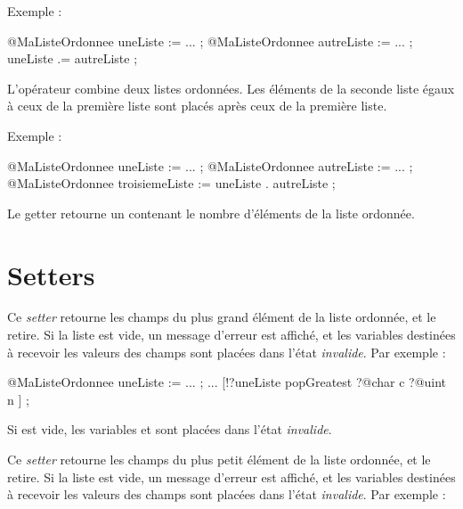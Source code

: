 Exemple :
\begin{galgascode}
@MaListeOrdonnee uneListe := ... ;
@MaListeOrdonnee autreListe := ... ;
uneListe .= autreListe ;
\end{galgascode}


L'opérateur  combine deux listes ordonnées. Les éléments de la seconde liste égaux à ceux de la première liste sont placés après ceux de la première liste.

Exemple :
\begin{galgascode}
@MaListeOrdonnee uneListe := ... ;
@MaListeOrdonnee autreListe := ... ;
@MaListeOrdonnee troisiemeListe := uneListe . autreListe ;
\end{galgascode}








Le getter  retourne un  contenant le nombre d'éléments de la liste ordonnée.






\section{Setters}


Ce \emph{setter} retourne les champs du plus grand élément de la liste ordonnée, et le retire. Si la liste est vide, un message d'erreur est affiché, et les variables destinées à recevoir les valeurs des champs sont placées dans l'état \emph{invalide}. Par exemple :

\begin{galgascode}
@MaListeOrdonnee uneListe := ... ;
...
[!?uneListe popGreatest
  ?@char c
  ?@uint n
] ;
\end{galgascode}

Si  est vide, les variables  et  sont placées dans l'état \emph{invalide}.



Ce \emph{setter} retourne les champs du plus petit élément de la liste ordonnée, et le retire. Si la liste est vide, un message d'erreur est affiché, et les variables destinées à recevoir les valeurs des champs sont placées dans l'état \emph{invalide}. Par exemple :

